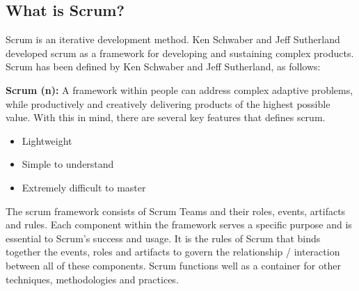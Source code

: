 \subsection{What is Scrum?}


Scrum is an iterative development method\cite{scrumguide11}.
Ken Schwaber and Jeff Sutherland developed scrum as a framework for developing 
and sustaining complex products\cite{scrumguide11}. Scrum has been defined by 
Ken Schwaber and Jeff Sutherland, as follows:


\textbf{Scrum (n):} A framework within people can address complex adaptive 
problems, while productively and creatively delivering products of the highest 
possible value\cite{scrumguide11}.
With this in mind, there are several key features that defines 
scrum\cite{scrumguide11}.


\begin{itemize}
	\item Lightweight
	\item Simple to understand
	\item Extremely difficult to master
\end{itemize}


The scrum framework consists of Scrum Teams and their roles, events, artifacts 
and rules\cite{scrumguide11}. Each component within the framework serves a 
specific purpose and is essential to Scrum's success and 
usage\cite{scrumguide11}. 
It is the rules of Scrum that binds together the events, roles and artifacts 
to govern the relationship / interaction between all of these 
components\cite{scrumguide11}. Scrum functions well as a container for other 
techniques, methodologies and practices\cite{scrumguide11}.



